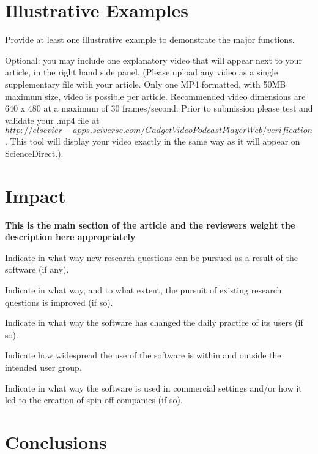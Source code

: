 \documentclass[preprint,12pt, a4paper]{elsarticle}
\begin{document}
\section{Illustrative Examples}\label{sec:examples}

Provide at least one illustrative example to demonstrate the major functions.

Optional: you may include one explanatory video that will appear next to your
article, in the right hand side panel. (Please upload any video as a single
supplementary file with your article. Only one MP4 formatted, with 50MB
maximum size, video is possible per article. Recommended video dimensions are
640 x 480 at a maximum of 30 frames/second. Prior to submission please test
and validate your .mp4 file at $
http://elsevier-apps.sciverse.com/GadgetVideoPodcastPlayerWeb/verification$.
This tool will display your video exactly in the same way as it will appear
on ScienceDirect.).


\section{Impact}\label{sec:impact}

\textbf{This is the main section of the article and the reviewers weight the
description here appropriately}

Indicate in what way new research questions can be pursued as a result of the
software (if any).

Indicate in what way, and to what extent, the pursuit of existing research
questions is improved (if so).

Indicate in what way the software has changed the daily practice of its users
(if so).

Indicate how widespread the use of the software is within and outside the
intended user group.

Indicate in what way the software is used in commercial settings and/or how
it led to the creation of spin-off companies (if so).


\section{Conclusions}\label{sec:conclusions}
\end{document}
